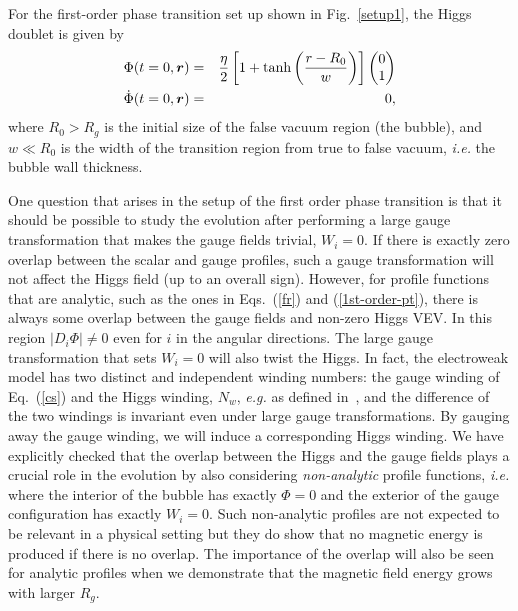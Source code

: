 \documentclass[prd,twocolumn,nofootinbib]{revtex4-1}
\begin{document}
For the first-order phase transition set up shown in Fig.~\ref{setup1}, the Higgs doublet 
is given by
\begin{eqnarray}
\Phi (t=0,{\bm r}) &=&  \frac{\eta}{2} \left [ 1+\tanh \left ( \frac{r-R_0}{w}\right ) \right ] 
\begin{pmatrix} 0 \\ 1 \end{pmatrix} \notag \\
\dot\Phi(t=0,{\bm r})&=&0,
\label{1st-order-pt}
\end{eqnarray}
where $R_0 > R_g$ is the initial size of the false vacuum region (the bubble), 
and $w \ll R_0$ is the width of the transition region from true to false
vacuum, {\it i.e.} the bubble wall thickness.

One question that arises in the setup of the first order phase transition is that it should
be possible to study the evolution after performing a large gauge transformation that
makes the gauge fields trivial, $W_i=0$. If there is exactly zero overlap between the scalar
and gauge profiles, such a gauge transformation will not affect the Higgs field (up to
an overall sign). However, for profile functions that are analytic, such as the ones in
Eqs.~(\ref{fr}) and (\ref{1st-order-pt}), there is always some overlap between the gauge 
fields and non-zero Higgs VEV. In this region $|D_i\Phi|\ne 0$ even for $i$ in the angular 
directions. The large gauge transformation that sets $W_i=0$ will also twist the Higgs.
In fact, the electroweak model has two distinct and independent winding 
numbers: the gauge winding of Eq.~(\ref{cs}) and the Higgs winding, $N_w$, {\it e.g.} 
as defined in~\cite{Mou:2017zwe}, and the difference of the two windings is invariant
even under large gauge transformations. By gauging away the gauge winding, we will 
induce a corresponding Higgs winding. We have explicitly checked that the overlap 
between the Higgs and the gauge fields plays a crucial role in the evolution by also 
considering {\it non-analytic} profile functions, {\it i.e.} where the interior of the bubble 
has exactly $\Phi=0$ and the exterior of the gauge configuration has exactly $W_i=0$. 
Such non-analytic profiles are not expected to be relevant in a physical setting but they
do show that no magnetic energy is produced if there is no overlap.
The importance of the overlap will also be seen for analytic profiles 
when we demonstrate that the magnetic field energy grows with larger $R_g$.
\end{document}
